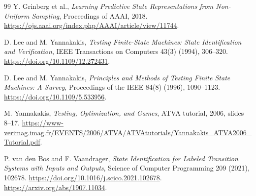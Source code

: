 \documentclass[11pt]{article}
\theoremstyle{definition}
\begin{document}
\begin{thebibliography}{99}
Y. Grinberg et al., \emph{Learning Predictive State Representations from
Non-Uniform Sampling}, Proceedings of AAAI, 2018.
\url{https://ojs.aaai.org/index.php/AAAI/article/view/11744}.

D. Lee and M. Yannakakis, \emph{Testing Finite-State Machines: State
Identification and Verification}, IEEE Transactions on Computers 43(3)
(1994), 306--320. \url{https://doi.org/10.1109/12.272431}.

D. Lee and M. Yannakakis, \emph{Principles and Methods of Testing Finite
State Machines: A Survey}, Proceedings of the IEEE 84(8) (1996),
1090--1123. \url{https://doi.org/10.1109/5.533956}.

M. Yannakakis, \emph{Testing, Optimization, and Games}, ATVA tutorial,
2006, slides 8--17.
\url{https://www-verimag.imag.fr/EVENTS/2006/ATVA/ATVAtutorials/Yannakakis_ATVA2006_Tutorial.pdf}.

P. van den Bos and F. Vaandrager, \emph{State Identification for Labeled
Transition Systems with Inputs and Outputs}, Science of Computer
Programming 209 (2021), 102678.
\url{https://doi.org/10.1016/j.scico.2021.102678}.
\url{https://arxiv.org/abs/1907.11034}.

\end{thebibliography}
\end{document}
